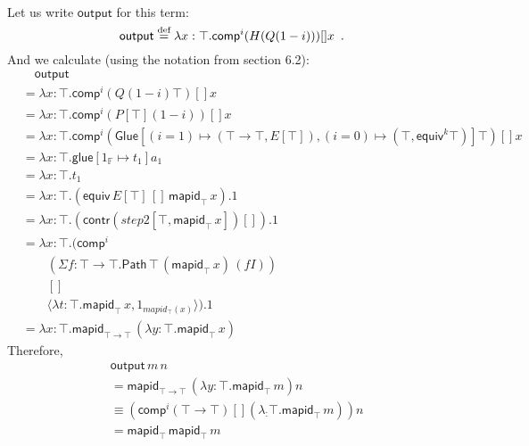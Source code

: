 \documentclass[a4paper,UKenglish]{lipics-v2016}
\newcommand*{\eqdef}{\mathrel{\smash{\stackrel{\text{def}}{=}}}}
\newcommand{\Path}[3]{\ensuremath{\mathsf{Path} \, {#1} \, {#2} \, {#3}}}
\newcommand{\outputt}{\mathsf{output}}
\newcommand{\mapid}[2]{\mathsf{mapid}_{#1} \, {#2}}
\newcommand{\comp}{\mathsf{comp}}
\theoremstyle{plain}
\theoremstyle{definition}
\begin{document}
Let us write $\outputt$ for this term:
\[ \outputt \eqdef \lambda x : \top. \comp^i (H (Q (1 - i))) [] x \enspace . \]
And we calculate (using the notation from \cite{cchm:cubical} section 6.2):
\begin{align*}
& \quad \outputt \\
& = \lambda x : \top. \comp^i (Q (1 - i) \top) [] x \\
& = \lambda x : \top. \comp^i (P[\top] (1 - i)) [] x \\
& = \lambda x : \top. \comp^i (\mathsf{Glue}[(i = 1) \mapsto (\top \rightarrow \top, E[\top]), (i = 0) \mapsto (\top, \mathsf{equiv}^k \top)] \top) [] x \\
& = \lambda x : \top. \mathsf{glue} [ 1_\mathbb{F} \mapsto t_1 ] a_1 \\
& = \lambda x : \top. t_1 \\
& = \lambda x : \top. (\mathsf{equiv} \, E[\top] \, [] \, \mapid{\top}{x}).1 \\
& = \lambda x : \top. (\mathsf{contr} (step2[\top, \mapid{\top}{x}]) []).1 \\
& = \lambda x : \top. (\comp^i \\
& \qquad (\Sigma f : \top \rightarrow \top. \Path{\top}{(\mapid{\top}{x})}{(fI)}) \\
& \qquad [] \\
& \qquad \langle \lambda t : \top. \mapid{\top}{x}, 1_{mapid_\top(x)} \rangle).1 \\
& = \lambda x : \top. \mapid{\top \rightarrow \top}{(\lambda y : \top. \mapid{\top}{x})}
\end{align*}
Therefore,
\begin{align*}
& \outputt \, m \, n \\
& = \mapid{\top \rightarrow \top}{(\lambda y : \top. \mapid{\top}{m})} n \\
& \equiv (\comp^i (\top \rightarrow \top) [] (\lambda _ : \top. \mapid{\top}{m})) n \\
& = \mapid{\top}{\mapid{\top}{m}}
\end{align*}
\end{document}
